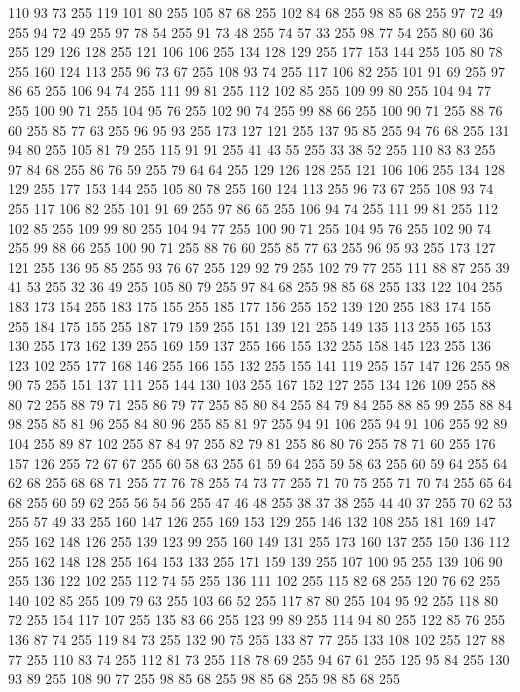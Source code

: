 110 93 73 255 119 101 80 255 105 87 68 255 102 84 68 255 98 85 68 255 97 72 49 255 94 72 49 255 97 78 54 255 91 73 48 255 74 57 33 255 98 77 54 255 80 60 36 255 129 126 128 255 121 106 106 255 134 128 129 255 177 153 144 255 105 80 78 255 160 124 113 255 96 73 67 255 108 93 74 255 117 106 82 255 101 91 69 255 97 86 65 255 106 94 74 255 111 99 81 255 112 102 85 255 109 99 80 255 104 94 77 255 100 90 71 255 104 95 76 255 102 90 74 255 99 88 66 255 100 90 71 255 88 76 60 255 85 77 63 255 96 95 93 255 173 127 121 255 137 95 85 255 94 76 68 255 131 94 80 255 105 81 79 255 115 91 91 255 41 43 55 255 33 38 52 255 110 83 83 255 97 84 68 255 86 76 59 255 79 64 64 255 129 126 128 255 121 106 106 255 134 128 129 255 177 153 144 255 105 80 78 255 160 124 113 255 96 73 67 255 108 93 74 255 117 106 82 255 101 91 69 255 97 86 65 255 106 94 74 255 111 99 81 255 112 102 85 255 109 99 80 255 104 94 77 255
100 90 71 255 104 95 76 255 102 90 74 255 99 88 66 255 100 90 71 255 88 76 60 255 85 77 63 255 96 95 93 255 173 127 121 255 136 95 85 255 93 76 67 255 129 92 79 255 102 79 77 255 111 88 87 255 39 41 53 255 32 36 49 255 105 80 79 255 97 84 68 255 98 85 68 255 133 122 104 255 183 173 154 255 183 175 155 255 185 177 156 255 152 139 120 255 183 174 155 255 184 175 155 255 187 179 159 255 151 139 121 255 149 135 113 255 165 153 130 255 173 162 139 255 169 159 137 255 166 155 132 255 158 145 123 255 136 123 102 255 177 168 146 255 166 155 132 255 155 141 119 255 157 147 126 255 98 90 75 255 151 137 111 255 144 130 103 255 167 152 127 255 134 126 109 255 88 80 72 255 88 79 71 255 86 79 77 255 85 80 84 255 84 79 84 255 88 85 99 255 88 84 98 255 85 81 96 255 84 80 96 255 85 81 97 255 94 91 106 255 94 91 106 255 92 89 104 255 89 87 102 255 87 84 97 255 82 79 81 255 86 80 76 255 78 71 60 255 176 157 126 255 72 67 67 255
60 58 63 255 61 59 64 255 59 58 63 255 60 59 64 255 64 62 68 255 68 68 71 255 77 76 78 255 74 73 77 255 71 70 75 255 71 70 74 255 65 64 68 255 60 59 62 255 56 54 56 255 47 46 48 255 38 37 38 255 44 40 37 255 70 62 53 255 57 49 33 255 160 147 126 255 169 153 129 255 146 132 108 255 181 169 147 255 162 148 126 255 139 123 99 255 160 149 131 255 173 160 137 255 150 136 112 255 162 148 128 255 164 153 133 255 171 159 139 255 107 100 95 255 139 106 90 255 136 122 102 255 112 74 55 255 136 111 102 255 115 82 68 255 120 76 62 255 140 102 85 255 109 79 63 255 103 66 52 255 117 87 80 255 104 95 92 255 118 80 72 255 154 117 107 255 135 83 66 255 123 99 89 255 114 94 80 255 122 85 76 255 136 87 74 255 119 84 73 255 132 90 75 255 133 87 77 255 133 108 102 255 127 88 77 255 110 83 74 255 112 81 73 255 118 78 69 255 94 67 61 255 125 95 84 255 130 93 89 255 108 90 77 255 98 85 68 255 98 85 68 255 98 85 68 255
